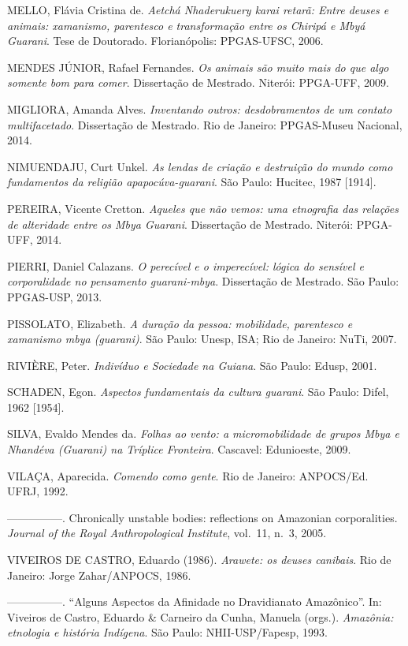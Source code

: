 MELLO, Flávia Cristina de. \emph{Aetchá Nhaderukuery karai retarã: Entre
deuses e animais: xamanismo, parentesco e transformação entre os
Chiripá e Mbyá Guarani}. Tese de Doutorado. Florianópolis: PPGAS-UFSC,
2006.

MENDES JÚNIOR, Rafael Fernandes. \emph{Os animais são muito mais do que algo
somente bom para comer}. Dissertação de Mestrado. Niterói: PPGA-UFF,
2009.

MIGLIORA, Amanda Alves. \emph{Inventando outros: desdobramentos de um contato
multifacetado}. Dissertação de Mestrado. Rio de Janeiro: PPGAS-Museu
Nacional, 2014.

NIMUENDAJU, Curt Unkel. \emph{As lendas de criação e destruição do mundo como
fundamentos da religião apapocúva-guarani}. São Paulo: Hucitec, 1987
[1914].

PEREIRA, Vicente Cretton. \emph{Aqueles que não vemos: uma etnografia das
relações de alteridade entre os Mbya Guarani}. Dissertação de Mestrado.
Niterói: PPGA-UFF, 2014.

PIERRI, Daniel Calazans. \emph{O perecível e o imperecível: lógica do sensível
e corporalidade no pensamento guarani-mbya}. Dissertação de Mestrado.
São Paulo: PPGAS-USP, 2013.

PISSOLATO, Elizabeth. \emph{A duração da pessoa: mobilidade, parentesco e
xamanismo mbya (guarani)}. São Paulo: Unesp, ISA; Rio de Janeiro: NuTi,
2007.

RIVIÈRE, Peter. \emph{Indivíduo e Sociedade na Guiana}. São Paulo: Edusp, 2001.

SCHADEN, Egon. \emph{Aspectos fundamentais da cultura guarani}. São Paulo:
Difel, 1962 [1954]. 

SILVA, Evaldo Mendes da. \emph{Folhas ao vento: a micromobilidade de grupos
Mbya e Nhandéva (Guarani) na Tríplice Fronteira}. Cascavel: Edunioeste,
2009.

VILAÇA, Aparecida. \emph{Comendo como gente}. Rio de Janeiro: ANPOCS/Ed. UFRJ,
1992.

—————. Chronically unstable bodies: reflections on Amazonian
corporalities. \emph{Journal of the Royal Anthropological Institute}, vol.~11, n.~3,
2005.

VIVEIROS DE CASTRO, Eduardo (1986). \emph{Arawete: os deuses canibais}. Rio de
Janeiro: Jorge Zahar/ANPOCS, 1986.

—————. ``Alguns Aspectos da Afinidade no Dravidianato Amazônico''. In:
Viveiros de Castro, Eduardo \& Carneiro da Cunha, Manuela (orgs.).
\emph{Amazônia: etnologia e história Indígena}. São Paulo: NHII-USP/Fapesp,
1993.

